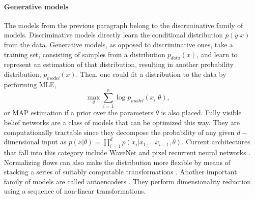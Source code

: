 \paragraph{Generative models} 
The models from the previous paragraph belong to the discriminative family of models. Discriminative models directly learn the conditional distribution $p(y|x)$ from the data.
Generative models, as opposed to discriminative ones, take a training set, consisting of samples from a distribution $p_{data}(x)$, and learn to represent an estimation of that distribution, resulting in another probability distribution, $p_{model}(x)$. Then, one could fit a distribution to the data by performing MLE,
$$
\max_{\theta} \sum_{i=1}^n \log p_{model} (x_i | \theta),
$$
or MAP estimation if a prior over the parameters $\theta$ is also placed. Fully visible belief networks \parencite{10.5555/2998828.2998922} are a class of models that can be optimized this way. They are computationally tractable since they decompose the probability of any given $d-$dimensional input as $p(x | \theta) = \prod_{i=1}^d p(x_i | x_1 , \ldots x_{i-1}, \theta)$. Current architectures that fall into this category include WaveNet \parencite{oord2016wavenet} and pixel recurrent neural networks \parencite{pmlr-v48-oord16}. Normalizing flows can also make the distribution more flexible by means of stacking a series of suitably computable transformations \parencite{rezende2015variational}.
Another important family of models are called autoencoders \parencite{autoencoders,kingma2013auto}. They perform dimensionality reduction 
using a sequence of non-linear transformations.

